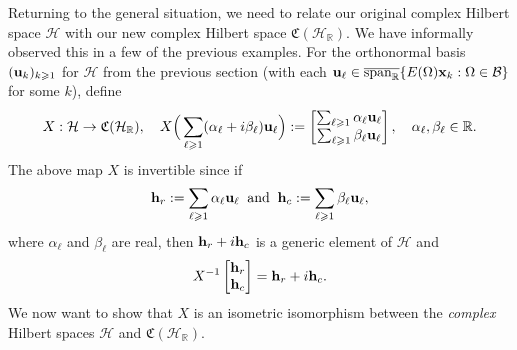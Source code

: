 \documentclass{dis}
\theoremstyle{plain}
\theoremstyle{definition}
\def\R{\mathbb{R}}
\renewcommand{\geq}{\geqslant}
\renewcommand{\vec}[1]{{\bf #1}}
\newcommand{\0}{{\color{lightgray}0}}
\begin{document}
Returning to the general situation, we need to relate our original complex Hilbert space $\mathcal{H}$ with our new complex Hilbert space $\mathfrak{C}(\mathcal{H}_{\R})$. We have informally observed this in a few of the previous examples.  For the orthonormal basis $(\vec{u}_k)_{k \geq 1}$ for $\mathcal{H}$ from the previous section (with each $\vec{u}_{\ell} \in \overline{\operatorname{span}_{\R}} \{E(\Omega) \vec{x}_k: \Omega \in \mathcal{B}\}$ for some $k$), define
\begin{equation}\label{XXXXex}
X: \mathcal{H} \to \mathfrak{C}(\mathcal{H}_{\R}), \quad X\Big(\sum_{\ell \geq 1} (\alpha_{\ell} + i \beta_{\ell}) \vec{u}_{\ell}\Big) := \begin{bmatrix} \sum_{\ell \geq 1} \alpha_{\ell} \vec{u}_{\ell}\\ \sum_{\ell \geq 1} \beta_{\ell} \vec{u}_{\ell}\end{bmatrix}, \quad \alpha_{\ell}, \beta_{\ell} \in \R.
\end{equation}
The above map $X$ is invertible since if
$$\vec{h}_{r} := \sum_{\ell \geq 1} \alpha_{\ell} \vec{u}_{\ell} \; \; \mbox{and} \; \; \vec{h}_c := \sum_{\ell \geq 1} \beta_{\ell} \vec{u}_{\ell},$$ where $\alpha_{\ell}$ and $\beta_{\ell}$ are real, then
$\vec{h}_r + i \vec{h}_c$ is a generic element of $\mathcal{H}$ and
$$X^{-1}\begin{bmatrix} \vec{h}_r\\ \vec{h}_c\end{bmatrix} = \vec{h}_{r} + i \vec{h}_c.$$
We now want to show that $X$ is an isometric isomorphism between the {\em complex} Hilbert spaces $\mathcal{H}$ and $\mathfrak{C}(\mathcal{H}_{\R})$.
\end{document}
